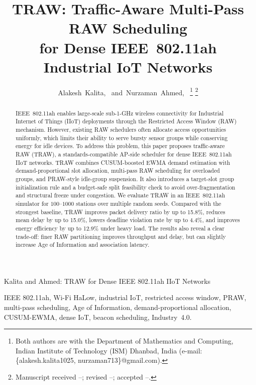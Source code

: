 \documentclass[journal]{IEEEtran}
\begin{document}
\title{TRAW: Traffic-Aware Multi-Pass RAW Scheduling\\
for Dense IEEE~802.11ah Industrial IoT Networks}

\author{Alakesh~Kalita,~
        and~Nurzaman~Ahmed,~%
\thanks{Both authors are with the Department of Mathematics
and Computing, Indian Institute of Technology (ISM) Dhanbad,
India (e-mail: \{alakesh.kalita1025, nurzaman713\}@gmail.com).}%
\thanks{Manuscript received --; revised --; accepted --.}}

%
{Kalita and Ahmed: TRAW for Dense IEEE 802.11ah IIoT Networks}

\IEEEpeerreviewmaketitle

\begin{abstract}
IEEE~802.11ah enables large-scale sub-1-GHz wireless connectivity for
Industrial Internet of Things (IIoT) deployments through the Restricted
Access Window (RAW) mechanism. However, existing RAW schedulers often
allocate access opportunities uniformly, which limits their ability to
serve bursty sensor groups while conserving energy for idle devices. To
address this problem, this paper proposes traffic-aware RAW (TRAW), a
standards-compatible AP-side scheduler for dense IEEE~802.11ah IIoT
networks. TRAW combines CUSUM-boosted EWMA demand estimation with
demand-proportional slot allocation, multi-pass RAW scheduling for
overloaded groups, and PRAW-style idle-group suspension. It also
introduces a target-slot group initialization rule and a budget-safe
split feasibility check to avoid over-fragmentation and structural
freeze under congestion. We evaluate TRAW in an IEEE~802.11ah simulator
for $100$--$1000$ stations over multiple random seeds. Compared with
the strongest baseline, TRAW improves packet delivery ratio by up to
15.8\%, reduces mean delay by up to 15.0\%, lowers deadline violation
rate by up to 4.4\%, and improves energy efficiency by up to 12.9\%
under heavy load. The results also reveal a clear trade-off: finer RAW
partitioning improves throughput and delay, but can slightly increase
Age of Information and association latency.
\end{abstract}

\begin{IEEEkeywords}
IEEE 802.11ah, Wi-Fi HaLow, industrial IoT, restricted access window,
PRAW, multi-pass scheduling, Age of Information, demand-proportional
allocation, CUSUM-EWMA, dense IoT, beacon scheduling, Industry~4.0.
\end{IEEEkeywords}
\end{document}
